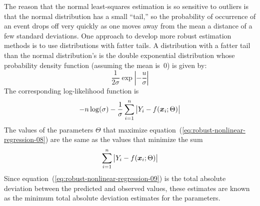 \documentclass{admbmanual}
\begin{document}
The reason that the normal least-squares estimation is so sensitive to
outliers is that the normal distribution has a small ``tail,''
so the probability of occurrence of an event drops
off very quickly as one moves away from the mean a distance of a few
standard deviations.  One approach to develop more robust
estimation methods is to use distributions with fatter tails.
A distribution with a fatter tail than the normal distribution's
is the double exponential distribution whose probability
density function (assuming the mean is~0) is given by:
\begin{equation}\label{eq:robust-nonlinear-regression-07} %
  \frac{1}{2\sigma} 
    \exp\left|-\frac{u}{\sigma}\right|
\end{equation}
The corresponding log-likelihood function is
\begin{equation}\label{eq:robust-nonlinear-regression-08} %
  -n\log(\sigma)-\frac{1}{\sigma}\sum_{i=1}^n\big|Y_i-f({\mbox{\boldmath $x$}}_i;\Theta)\big|
\end{equation}
The values of the parameters $\Theta$ that maximize
equation~(\ref{eq:robust-nonlinear-regression-08}) %
are the same as the values that minimize the sum
\begin{equation}\label{eq:robust-nonlinear-regression-09} %
 \sum_{i=1}^n\big|Y_i-f({\mbox{\boldmath $x$}}_i;\Theta)\big|
\end{equation}
Since equation~(\ref{eq:robust-nonlinear-regression-09}) %
is the total absolute deviation between
the predicted and observed values, these estimates are
known as the minimum total absolute deviation estimates for the
parameters.
\end{document}
